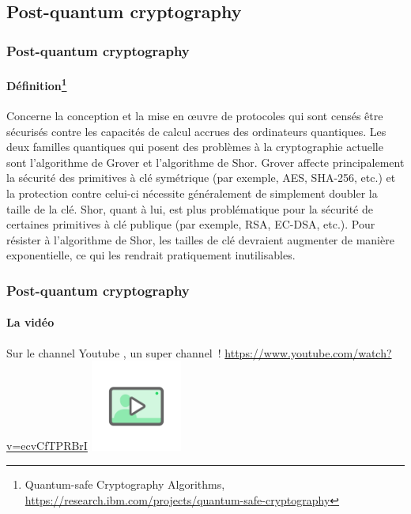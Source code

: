 \documentclass{beamer}
\begin{document}
    \subsection{Post-quantum cryptography}\label{subsec:pqc}
    \begin{frame}
        \frametitle{Post-quantum cryptography}
        \framesubtitle{Définition\footnote{Quantum-safe Cryptography Algorithms, \url{https://research.ibm.com/projects/quantum-safe-cryptography}}}
        \transdissolve
        Concerne la conception et la mise en œuvre de protocoles qui sont censés être sécurisés contre les capacités de calcul accrues des ordinateurs quantiques.
        Les deux familles quantiques qui posent des problèmes à la cryptographie actuelle sont l'algorithme de Grover et l'algorithme de Shor.
        \bigbreak
        Grover affecte principalement la sécurité des primitives à clé symétrique (par exemple, AES, SHA-256, etc.) et la protection contre celui-ci nécessite généralement de simplement doubler la taille de la clé.
        \bigbreak
        Shor, quant à lui, est plus problématique pour la sécurité de certaines primitives à clé publique (par exemple, RSA, EC-DSA, etc.).
        Pour résister à l'algorithme de Shor, les tailles de clé devraient augmenter de manière exponentielle, ce qui les rendrait pratiquement inutilisables.
    \end{frame}

    \begin{frame}
        \frametitle{Post-quantum cryptography}
        \framesubtitle{La vidéo}
        \transdissolve
        Sur le channel Youtube , un super channel~! \url{https://www.youtube.com/watch?v=ecvCfTPRBrI}
        \bigbreak
        \centering
        \includegraphics[width=3cm]{image/digicomp-video}
    \end{frame}
\end{document}
